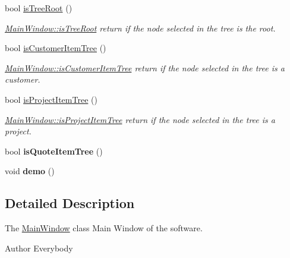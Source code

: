 \begin{DoxyCompactItemize}
bool \hyperlink{classGui_1_1MainWindow_acaf52b97656cc6d69761b065b97a6077}{is\+Tree\+Root} ()
\begin{DoxyCompactList}\small\item\em \hyperlink{classGui_1_1MainWindow_acaf52b97656cc6d69761b065b97a6077}{Main\+Window\+::is\+Tree\+Root} return if the node selected in the tree is the root. \end{DoxyCompactList}\item 
bool \hyperlink{classGui_1_1MainWindow_a15f26af9a47e3b7d3dfe961c9dcd57c6}{is\+Customer\+Item\+Tree} ()
\begin{DoxyCompactList}\small\item\em \hyperlink{classGui_1_1MainWindow_a15f26af9a47e3b7d3dfe961c9dcd57c6}{Main\+Window\+::is\+Customer\+Item\+Tree} return if the node selected in the tree is a customer. \end{DoxyCompactList}\item 
bool \hyperlink{classGui_1_1MainWindow_a62789c0cd5dfdb3cca34002188648252}{is\+Project\+Item\+Tree} ()
\begin{DoxyCompactList}\small\item\em \hyperlink{classGui_1_1MainWindow_a62789c0cd5dfdb3cca34002188648252}{Main\+Window\+::is\+Project\+Item\+Tree} return if the node selected in the tree is a project. \end{DoxyCompactList}\item 
\hypertarget{classGui_1_1MainWindow_ab4fb4334fc6eb75d3bed1a239173548e}{bool {\bfseries is\+Quote\+Item\+Tree} ()}\label{classGui_1_1MainWindow_ab4fb4334fc6eb75d3bed1a239173548e}

\item 
\hypertarget{classGui_1_1MainWindow_aeb176a1942f2e0e442deef58717b8678}{void {\bfseries demo} ()}\label{classGui_1_1MainWindow_aeb176a1942f2e0e442deef58717b8678}

\end{DoxyCompactItemize}


\subsection{Detailed Description}
The \hyperlink{classGui_1_1MainWindow}{Main\+Window} class Main Window of the software. 

\begin{DoxyAuthor}{Author}
Everybody 
\end{DoxyAuthor}


